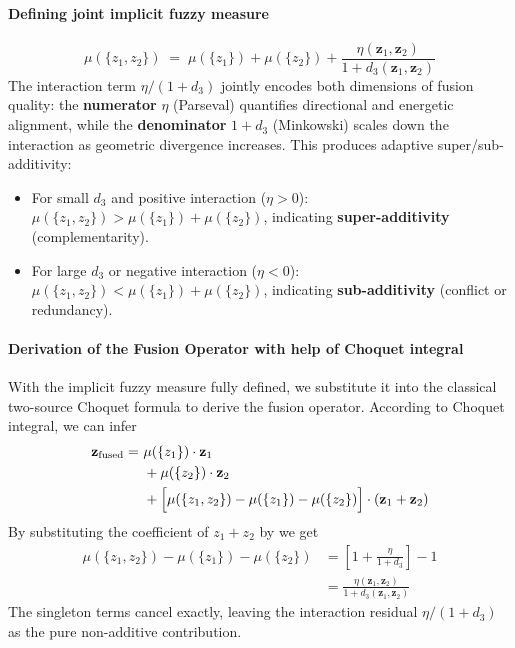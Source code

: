 \documentclass[12pt]{article}
\begin{document}
\paragraph{Defining joint implicit fuzzy measure }
\begin{equation*}
    \mu(\{z_1, z_2\}) \;=\; \mu(\{z_1\}) + \mu(\{z_2\}) + \frac{\eta(\mathbf{z}_1, \mathbf{z}_2)}{1 + d_3(\mathbf{z}_1, \mathbf{z}_2)}
\end{equation*}
The interaction term $\eta/(1{+}d_3)$ jointly encodes both dimensions of fusion quality: the \textbf{numerator} $\eta$ (Parseval) quantifies directional and energetic alignment, while the \textbf{denominator} $1+d_3$ (Minkowski) scales down the interaction as geometric divergence increases. This produces adaptive super/sub-additivity:
\begin{itemize}
    \item For small $d_3$ and positive interaction ($\eta > 0$): $\mu(\{z_1, z_2\}) > \mu(\{z_1\}) + \mu(\{z_2\})$, indicating \textbf{super-additivity} (complementarity).
    \item For large $d_3$ or negative interaction ($\eta < 0$): $\mu(\{z_1, z_2\}) < \mu(\{z_1\}) + \mu(\{z_2\})$, indicating \textbf{sub-additivity} (conflict or redundancy).
\end{itemize}

\paragraph{Derivation of the Fusion Operator with help of Choquet integral}
With the implicit fuzzy measure fully defined, we substitute it into the classical two-source Choquet formula to derive the fusion operator. According to Choquet integral, we can infer
\begin{equation*}
\begin{aligned}
    \mathbf{z}_{\text{fused}} = \,\, & \mu(\{z_1\}) \cdot \mathbf{z}_1 \\
    & + \mu(\{z_2\}) \cdot \mathbf{z}_2 \\
    & + \Bigl[ \mu(\{z_1, z_2\}) - \mu(\{z_1\}) - \mu(\{z_2\}) \Bigr] \cdot (\mathbf{z}_1 + \mathbf{z}_2)
\end{aligned}
\end{equation*}
 By substituting the coefficient of $z_1+z_2$ by we get
\begin{equation*}
\begin{aligned}
    \mu(\{z_1, z_2\}) - \mu(\{z_1\}) - \mu(\{z_2\}) &= \left[ 1 + \frac{\eta}{1+d_3} \right] - 1 \\
    &= \frac{\eta(\mathbf{z}_1, \mathbf{z}_2)}{1 + d_3(\mathbf{z}_1, \mathbf{z}_2)}
\end{aligned}
\end{equation*}
The singleton terms cancel exactly, leaving the interaction residual $\eta/(1+d_3)$ as the pure non-additive contribution.
\end{document}
